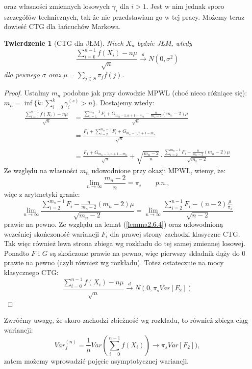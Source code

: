 \documentclass[a4paper]{article}
\theoremstyle{defn}
\theoremstyle{theorem}
\newtheorem{theorem}[defn]{Twierdzenie}
\theoremstyle{lemma}
\theoremstyle{cor}
\theoremstyle{fact}
\begin{document}
oraz własności zmiennych losowych $\gamma_i$ dla $i>1$. Jest w nim jednak sporo szczegółów technicznych, tak że nie przedstawiam go w tej pracy.
Możemy teraz dowieść CTG dla łańcuchów Markowa.\\
\begin{theorem}[CTG dla JŁM]\label{theorem2.6.5}
Niech $X_n$ będzie JŁM, wtedy
$$ \frac{\sum\limits_{i=0}^{n-1} f(X_i) - n\mu}{\sqrt{n}} \overset{d}{\to} N(0, \sigma^2)$$
dla pewnego $\sigma$ oraz $\mu = \sum\limits_{j \in S} \pi_j f(j)$.
\end{theorem}
\begin{proof}
Ustalmy $m_n$ podobne jak przy dowodzie MPWL (choć nieco różniące się):
$m_n = \inf \{k: \sum\limits_{i=0}^k \gamma_i^{(s)} > n\}$. Dostajemy wtedy:
\begin{align*}
    \frac{\sum\limits_{i=0}^{n-1} f(X_i) - n\mu}{\sqrt{n}} &= \frac{\sum\limits_{i=1}^{m_n-1} F_i + G_{m_n-1, n+ 1 - m_n} - \frac{n}{m_n-2}(m_n - 2)\mu}{\sqrt{n}}\\
    &= \frac{F_1 + \sum\limits_{i=2}^{m_n-1} F_i + G_{m_n-1, n+1 - m_n}}{\sqrt{n}}\\\\
    &= \frac{F_1 + G_{m_n-1, n + 1 - m_n} }{\sqrt{n}} + \sqrt{\frac{m_n -2}{n}} \cdot \frac{\sum\limits_{i=2}^{m_n-1} F_i  - \frac{n}{m_n-2}(m_n - 2)\mu}{\sqrt{m_n-2}}
\end{align*}
Ze względu na własności $m_n$ udowodnione przy okazji MPWL, wiemy, że:
$$ \lim\limits_{n \to \infty} \frac{m_n -2}{n} = \pi_s \quad\quad p.n.,$$
więc z arytmetyki granic:
$$\lim\limits_{n \to \infty} \frac{\sum\limits_{i=2}^{m_n-1} F_i  - \frac{n}{m_n-2}(m_n - 2)\mu}{\sqrt{m_n-2}} = \lim\limits_{n \to \infty} \frac{\sum\limits_{i=2}^{n-1} F_i - (n-2)\frac{\mu}{\pi_s}}{\sqrt{n-2}}$$
prawie na pewno. Ze względu na lemat (\ref{lemma2.6.4}) oraz udowodnioną wcześniej skończoność wariancji $F_i$ dla prawej strony zachodzi klasyczne CTG. Tak więc również lewa strona zbiega wg rozkładu do tej samej zmiennej losowej. Ponadto $F$ i $G$ są skończone prawie na pewno, więc pierwszy składnik dąży do 0 prawie na pewno (czyli również wg rozkładu).
Toteż ostatecznie na mocy klasycznego CTG:
$$\frac{\sum\limits_{i=0}^{n-1} f(X_i) - n\mu}{\sqrt{n}} \overset{d}{\to} N(0, \pi_s Var[F_2])$$
\end{proof}
Zwróćmy uwagę, że skoro zachodzi zbieżność wg rozkładu, to również zbiega ciąg wariancji:
$$Var_f^{(n)} = \frac{1}{n} Var\left(\sum\limits_{i=0}^{n-1} f(X_i)\right) \to \pi_s Var[F_2]),$$
zatem możemy wprowadzić pojęcie asymptotycznej wariancji.\\\\
\end{document}
